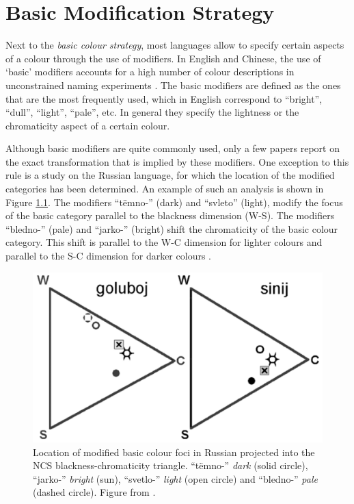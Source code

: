 \chapter{Basic Modification Strategy}
\label{s:basic-modification-strategy}
\label{s:last-strategy}

Next to the \emph{basic colour strategy}, most languages allow to
specify certain aspects of a colour through the use of modifiers. In
English and Chinese, the use of `basic' modifiers accounts for a high
number of colour descriptions in unconstrained naming experiments
\citep{simpson91sex, lin01unconstrained}. The basic modifiers are
defined as the ones that are the most frequently used, which in
English correspond to ``bright'', ``dull'', ``light'', ``pale'',
etc. In general they specify the lightness or the chromaticity aspect
of a certain colour.

Although basic modifiers are quite commonly used, only a few
papers report on the exact transformation that is implied by these
modifiers. One exception to this rule is a study on the Russian
language, for which the location of the modified categories has been
determined. An example of such an analysis is shown in Figure
\ref{f:ams-russian-diagram}. The modifiers ``t\"emno-'' (dark) and
``svleto'' (light), modify the focus of the basic category parallel to
the blackness dimension (W-S). The modifiers ``bledno-'' (pale) and
``jarko-'' (bright) shift the chromaticity of the basic colour
category. This shift is parallel to the W-C dimension for lighter
colours and parallel to the S-C dimension for darker colours
\citep{safuanova07russian}.

\begin{figure}[htpb]
  \centering
  \includegraphics[width=.6\textwidth]{./achromatic/figures/russian-diagram.pdf}
  \caption[Location of modified basic colour foci in Russian]{Location
    of modified basic colour foci in Russian projected into the NCS
    blackness-chromaticity triangle. ``t\"emno-'' \emph{dark} (solid
    circle), ``jarko-'' \emph{bright} (sun), ``svetlo-'' \emph{light}
    (open circle) and ``bledno-'' \emph{pale} (dashed circle). Figure
    from \cite{paramei05singing}.}
  \label{f:ams-russian-diagram}
\end{figure}

